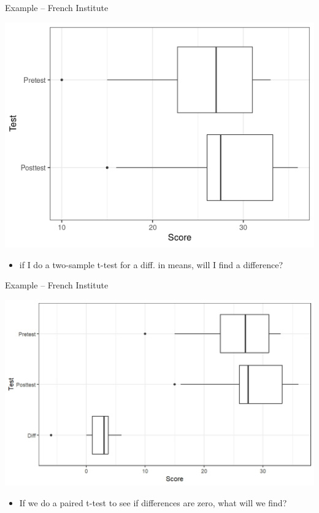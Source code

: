 \documentclass{beamer}
\begin{document}
\begin{frame}{Example -- French Institute}
\begin{center}
\includegraphics[scale=0.5]{french_prepost.png}
\end{center}
\begin{itemize}
    \item if I do a two-sample t-test for a diff. in means, will I find a difference?
\end{itemize}
\end{frame}

\begin{frame}{Example -- French Institute}
\begin{center}
\includegraphics[scale=0.6]{img/diff_plot.jpeg}
\end{center}
\begin{itemize}
    \item If we do a paired t-test to see if differences are zero, what will we find?
\end{itemize}
\end{frame}
\end{document}
